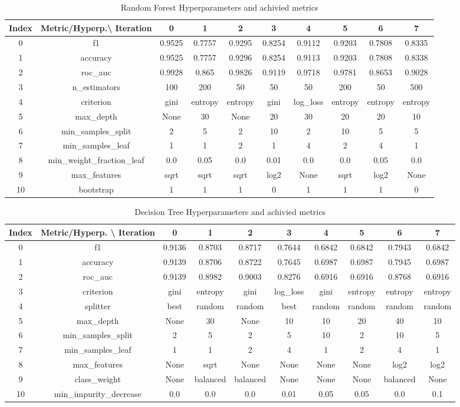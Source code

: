 \documentclass{article}%
\begin{document}
\begin{table}[h!]%
\caption{Random Forest Hyperparameters and achivied metrics}%
\vspace{0.2cm}%
\centering%
\begin{tabular}{|c||c||c||c||c||c||c||c||c||c|}%
\hline%
Index&Metric/Hyperp.\textbackslash{} Iteration&0&1&2&3&4&5&6&7\\%
\hline%
0&f1&0.9525&0.7757&0.9295&0.8254&0.9112&0.9203&0.7808&0.8335\\%
1&accuracy&0.9525&0.7757&0.9296&0.8254&0.9113&0.9203&0.7808&0.8338\\%
2&roc\_auc&0.9928&0.865&0.9826&0.9119&0.9718&0.9781&0.8653&0.9028\\%
3&n\_estimators&100&200&50&50&50&200&50&500\\%
4&criterion&gini&entropy&entropy&gini&log\_loss&entropy&entropy&entropy\\%
5&max\_depth&None&30&None&20&30&20&20&10\\%
6&min\_samples\_split&2&5&2&10&2&10&5&5\\%
7&min\_samples\_leaf&1&1&2&1&4&2&4&1\\%
8&min\_weight\_fraction\_leaf&0.0&0.05&0.0&0.01&0.0&0.0&0.05&0.0\\%
9&max\_features&sqrt&sqrt&sqrt&log2&None&sqrt&log2&None\\%
10&bootstrap&1&1&1&0&1&1&1&0\\%
\hline%
\end{tabular}%
\end{table}

%


\begin{table}[h!]%
\caption{Decision Tree Hyperparameters and achivied metrics}%
\vspace{0.2cm}%
\centering%
\begin{tabular}{|c||c||c||c||c||c||c||c||c||c|}%
\hline%
Index&Metric/Hyperp. \textbackslash{} Iteration&0&1&2&3&4&5&6&7\\%
\hline%
0&f1&0.9136&0.8703&0.8717&0.7644&0.6842&0.6842&0.7943&0.6842\\%
1&accuracy&0.9139&0.8706&0.8722&0.7645&0.6987&0.6987&0.7945&0.6987\\%
2&roc\_auc&0.9139&0.8982&0.9003&0.8276&0.6916&0.6916&0.8768&0.6916\\%
3&criterion&gini&entropy&gini&log\_loss&gini&entropy&entropy&entropy\\%
4&splitter&best&random&random&best&random&random&random&random\\%
5&max\_depth&None&30&None&10&10&20&40&10\\%
6&min\_samples\_split&2&5&2&5&10&2&10&5\\%
7&min\_samples\_leaf&1&1&2&4&1&2&4&1\\%
8&max\_features&None&sqrt&None&None&None&None&log2&log2\\%
9&class\_weight&None&balanced&balanced&None&None&None&balanced&None\\%
10&min\_impurity\_decrease&0.0&0.0&0.0&0.01&0.05&0.05&0.0&0.1\\%
\hline%
\end{tabular}%
\end{table}
\end{document}
